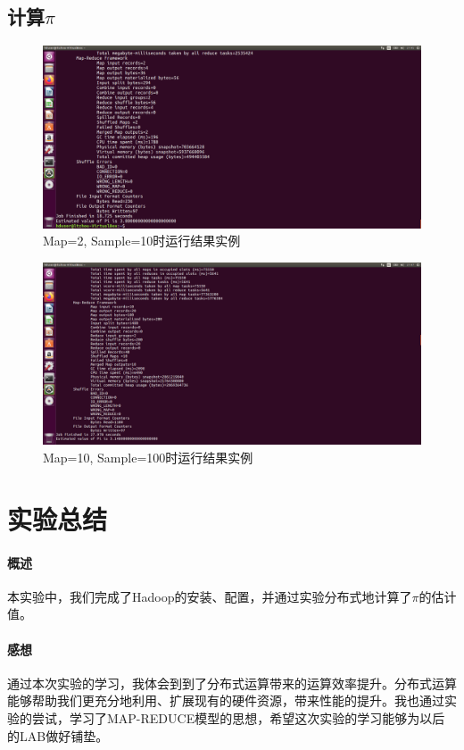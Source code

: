 \documentclass{article}
\begin{document}
\subsection{计算$\pi$}

\begin{figure}[htbp]
\centering
\includegraphics[width=13.5cm]{img/2-10.png}
\caption{Map=2, Sample=10时运行结果实例}
\label{fig:2-10}
\end{figure}

\begin{figure}[htbp]
\centering
\includegraphics[width=13.5cm]{img/10-100.png}
\caption{Map=10, Sample=100时运行结果实例}
\label{fig:2-10}
\end{figure}



\section{实验总结}
\paragraph{概述}
本实验中，我们完成了Hadoop的安装、配置，并通过实验分布式地计算了$\pi$的估计值。

\paragraph{感想}
通过本次实验的学习，我体会到到了分布式运算带来的运算效率提升。分布式运算能够帮助我们更充分地利用、扩展现有的硬件资源，带来性能的提升。我也通过实验的尝试，学习了MAP-REDUCE模型的思想，希望这次实验的学习能够为以后的LAB做好铺垫。
\end{document}
